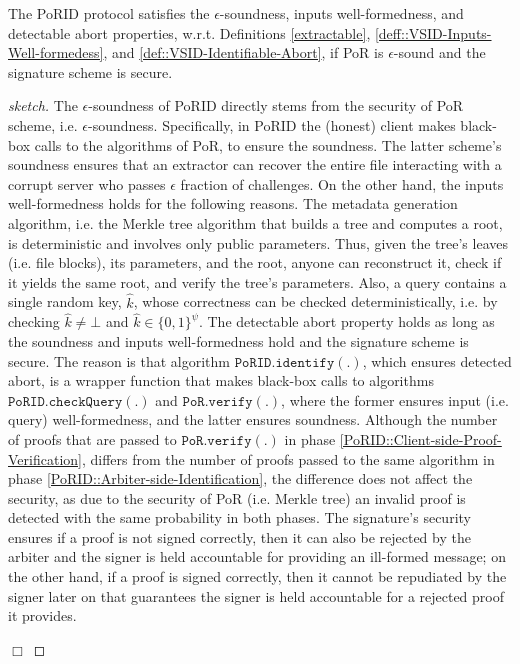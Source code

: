 \begin{theorem}
The PoRID protocol satisfies the $\epsilon$-soundness, inputs well-formedness, and detectable abort properties, w.r.t. Definitions \ref{extractable}, \ref{deff::VSID-Inputs-Well-formedess}, and \ref{def::VSID-Identifiable-Abort}, if PoR is $\epsilon$-sound and the  signature scheme is secure.
\end{theorem}


\begin{proof}[sketch]
The $\epsilon$-soundness of PoRID directly stems from the security of PoR scheme, i.e. $\epsilon$-soundness. Specifically,
in PoRID the (honest) client makes black-box calls to the algorithms of PoR, to ensure the soundness. The latter scheme's soundness ensures that an extractor can recover the entire file interacting with a corrupt server who passes  $\epsilon$ fraction of challenges. On the other hand, the inputs well-formedness holds for the following reasons. The metadata generation algorithm, i.e. the Merkle tree algorithm that builds a tree and computes a root, is deterministic and involves only public  parameters. Thus, given the tree's leaves (i.e. file blocks), its parameters, and the root, anyone can reconstruct it, check if it yields the same root, and verify the tree's parameters. Also, a query contains a single random key, $\hat{k}$, whose correctness can be checked deterministically, i.e. by checking $\hat{k}\neq \bot$ and  $\hat{k}\in \{0,1\}^{\scriptscriptstyle\psi}$. The detectable abort property holds as long as the soundness and inputs well-formedness hold and the signature scheme is secure. The reason is that algorithm $\mathtt{PoRID.identify}(.)$, which ensures detected abort, is a wrapper function that makes black-box calls to algorithms $\mathtt{PoRID.checkQuery}(.)$ and $\mathtt{PoR.verify}(.)$, where the former  ensures input (i.e. query) well-formedness, and the latter  ensures soundness.  Although the number of proofs that are passed to $\mathtt{PoR.verify}(.)$ in phase \ref{PoRID::Client-side-Proof-Verification}, differs from the number of proofs passed to the same algorithm in phase \ref{PoRID::Arbiter-side-Identification}, the difference does not affect the security, as due to the security of PoR (i.e.  Merkle tree) an invalid proof is detected with the same probability in both phases. The signature’s security ensures if a proof is not signed correctly, then it can also be rejected by the arbiter and the signer is held accountable for providing an ill-formed message; on the other hand, if a proof is signed correctly, then it cannot be repudiated by the signer later on that guarantees the signer is held accountable for a rejected proof it provides. 

 \hfill\(\Box\)\end{proof}


